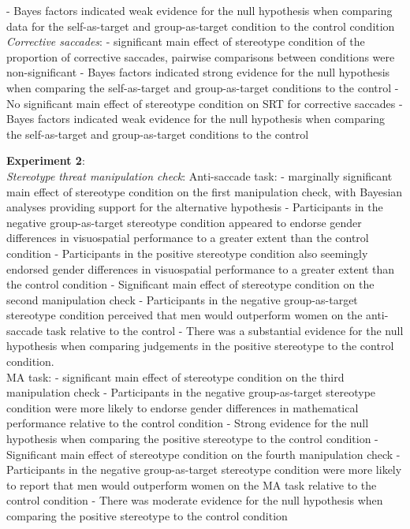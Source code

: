 \documentclass[
  doc, a4paper]{apa7}
\begin{document}
- Bayes factors indicated weak evidence for the null hypothesis when comparing data for the self-as-target and group-as-target condition to the control condition\\
\emph{Corrective saccades}:
- significant main effect of stereotype condition of the proportion of corrective saccades, pairwise comparisons between conditions were non-significant
- Bayes factors indicated strong evidence for the null hypothesis when comparing the self-as-target and group-as-target conditions to the control
- No significant main effect of stereotype condition on SRT for corrective saccades
- Bayes factors indicated weak evidence for the null hypothesis when comparing the self-as-target and group-as-target conditions to the control

\textbf{Experiment 2}:\\
\emph{Stereotype threat manipulation check}:
Anti-saccade task:
- marginally significant main effect of stereotype condition on the first manipulation check, with Bayesian analyses providing support for the alternative hypothesis
- Participants in the negative group-as-target stereotype condition appeared to endorse gender differences in visuospatial performance to a greater extent than the control condition
- Participants in the positive stereotype condition also seemingly endorsed gender differences in visuospatial performance to a greater extent than the control condition
- Significant main effect of stereotype condition on the second manipulation check
- Participants in the negative group-as-target stereotype condition perceived that men would outperform women on the anti-saccade task relative to the control
- There was a substantial evidence for the null hypothesis when comparing judgements in the positive stereotype to the control condition.\\
MA task:
- significant main effect of stereotype condition on the third manipulation check
- Participants in the negative group-as-target stereotype condition were more likely to endorse gender differences in mathematical performance relative to the control condition
- Strong evidence for the null hypothesis when comparing the positive stereotype to the control condition
- Significant main effect of stereotype condition on the fourth manipulation check
- Participants in the negative group-as-target stereotype condition were more likely to report that men would outperform women on the MA task relative to the control condition
- There was moderate evidence for the null hypothesis when comparing the positive stereotype to the control condition\\
\end{document}
